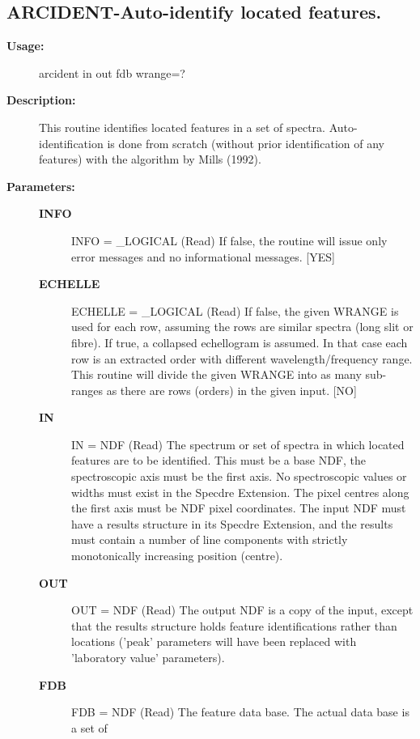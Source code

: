 \subsection{ARCIDENT-\label{ARCIDENT}Auto-identify located features.}
\begin{description}

\item [{\bf Usage:}]

   arcident in out fdb wrange=?


\item [{\bf Description:}]
   This routine identifies located features in a set of spectra.
   Auto-identification is done from scratch (without prior
   identification of any features) with the algorithm by Mills
   (1992).


\item [{\bf Parameters:}]
\begin{description}
\item [{\bf INFO}]
INFO = _LOGICAL (Read)
   If false, the routine will issue only error messages and no
   informational messages. [YES]
\item [{\bf ECHELLE}]
ECHELLE = _LOGICAL (Read)
   If false, the given WRANGE is used for each row, assuming the
   rows are similar spectra (long slit or fibre). If true, a
   collapsed echellogram is assumed. In that case each row is an
   extracted order with different wavelength/frequency range. This
   routine will divide the given WRANGE into as many sub-ranges as
   there are rows (orders) in the given input. [NO]
\item [{\bf IN}]
IN = NDF (Read)
   The spectrum or set of spectra in which located features are to
   be identified. This must be a base NDF, the spectroscopic axis
   must be the first axis. No spectroscopic values or widths must
   exist in the Specdre Extension. The pixel centres along the
   first axis must be NDF pixel coordinates. The input NDF must
   have a results structure in its Specdre Extension, and the
   results must contain a number of line components with strictly
   monotonically increasing position (centre).
\item [{\bf OUT}]
OUT = NDF (Read)
   The output NDF is a copy of the input, except that the results
   structure holds feature identifications rather than locations
   ('peak' parameters will have been replaced with 'laboratory
   value' parameters).
\item [{\bf FDB}]
FDB = NDF (Read)
   The feature data base. The actual data base is a set of

\end{description}
\end{description}
